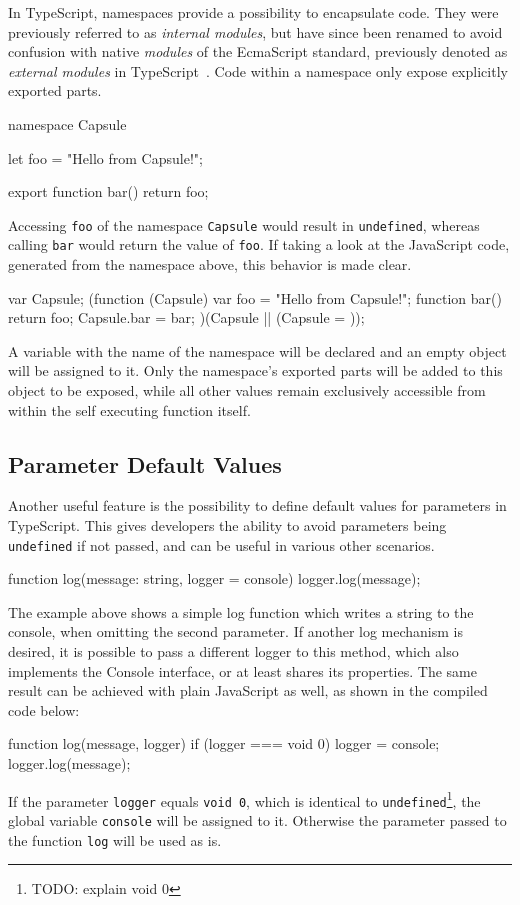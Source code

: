 In TypeScript, namespaces provide a possibility to encapsulate code. They were previously referred to as \emph{internal modules}, but have since been renamed to avoid confusion with native \emph{modules} of the EcmaScript standard, previously denoted as \emph{external modules} in TypeScript~\cite{TypeScriptHandbook:Namespaces}. Code within a namespace only expose explicitly exported parts.
\begin{JsCode}[numbers=none]
namespace Capsule {
  let foo = "Hello from Capsule!";
  
  export function bar() {
    return foo;
  }
}
\end{JsCode}
Accessing \texttt{foo} of the namespace \texttt{Capsule} would result in \texttt{undefined}, whereas calling \texttt{bar} would return the value of \texttt{foo}. If taking a look at the JavaScript code, generated from the namespace above, this behavior is made clear.
\begin{JsCode}[numbers=none]
var Capsule;
(function (Capsule) {
    var foo = "Hello from Capsule!";
    function bar() {
        return foo;
    }
    Capsule.bar = bar;
})(Capsule || (Capsule = {}));
\end{JsCode}
A variable with the name of the namespace will be declared and an empty object will be assigned to it. Only the namespace's exported parts will be added to this object to be exposed, while all other values 
remain exclusively accessible from within the self executing function itself.

\subsection{Parameter Default Values}
\label{sec:ts-parameter-default-values}

Another useful feature is the possibility to define default values for parameters in TypeScript. This gives developers the ability to avoid parameters being \texttt{undefined} if not passed, and can be useful in various other scenarios.
\begin{JsCode}[numbers=none]
function log(message: string, logger = console) {
  logger.log(message);
}
\end{JsCode}
The example above shows a simple log function which writes a string to the console, when omitting the second parameter. If another log mechanism is desired, it is possible to pass a different logger to this method, which also implements the Console interface, or at least shares its properties.
The same result can be achieved with plain JavaScript as well, as shown in the compiled code below:
\begin{JsCode}[numbers=none]
function log(message, logger) {
    if (logger === void 0) { logger = console; }
    logger.log(message);
}
\end{JsCode}
If the parameter \texttt{logger} equals \texttt{void 0}, which is identical to \texttt{undefined}\footnote{TODO: explain void 0}, the global variable \texttt{console} will be assigned to it. Otherwise the parameter passed to the function \texttt{log} will be used as is.

